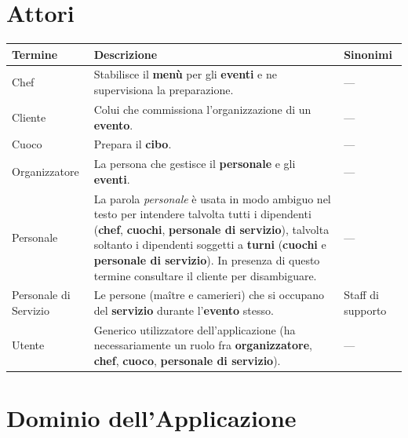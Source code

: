 
\section*{Attori}

\begin{longtable}{L{3.5cm} L{8.5cm} L{3cm}}
\toprule
\textbf{Termine} & \textbf{Descrizione} & \textbf{Sinonimi} \\
\midrule
\endhead
\bottomrule
\endfoot

Chef
& Stabilisce il \textbf{menù} per gli \textbf{eventi} e ne supervisiona
  la preparazione.
& — \\
\addlinespace

Cliente
& Colui che commissiona l'organizzazione di un \textbf{evento}.
& — \\
\addlinespace

Cuoco
& Prepara il \textbf{cibo}.
& — \\
\addlinespace

Organizzatore
& La persona che gestisce il \textbf{personale} e gli \textbf{eventi}.
& — \\
\addlinespace

Personale
& La parola \emph{personale} è usata in modo ambiguo nel testo per intendere
  talvolta tutti i dipendenti (\textbf{chef}, \textbf{cuochi},
  \textbf{personale di servizio}), talvolta soltanto i dipendenti soggetti
  a \textbf{turni} (\textbf{cuochi} e \textbf{personale di servizio}).
  In presenza di questo termine consultare il cliente per disambiguare.
& — \\
\addlinespace

Personale di Servizio
& Le persone (maître e camerieri) che si occupano del \textbf{servizio}
  durante l'\textbf{evento} stesso.
& Staff di supporto \\
\addlinespace

Utente
& Generico utilizzatore dell'applicazione (ha necessariamente un ruolo fra
  \textbf{organizzatore}, \textbf{chef}, \textbf{cuoco},
  \textbf{personale di servizio}).
& — \\

\end{longtable}

\section*{Dominio dell'Applicazione}

